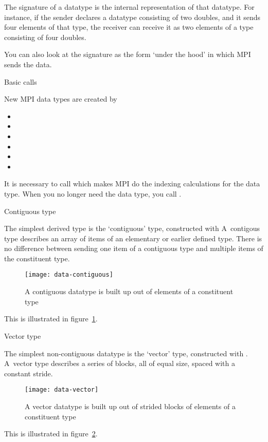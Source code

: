 The signature of a datatype is the internal representation of that
datatype. For instance, if the sender declares a datatype consisting
of two doubles, and it sends four elements of that type, the receiver
can receive it as two elements of a type consisting of four doubles.

You can also look at the signature as the form `under the hood' in which MPI
sends the data.


 {Basic calls}

New MPI data types are created by
\begin{itemize}
\item {}
\item {}
\item {}
\item {}
\item {}
\item {}
\end{itemize}
It is necessary to call  which makes MPI
do the indexing calculations for the data type.  When you no longer
need the data type, you call .

 {Contiguous type}

The simplest derived type is the `contiguous' type,
constructed with 
A~contigous type describes an array of items
of an elementary or earlier defined type. There is no difference between sending
one item of a contiguous type and multiple items of the constituent type.
\begin{figure}[ht]
  \texttt{[image: data-contiguous]}
  \caption{A contiguous datatype is built up out of elements of a constituent type}
  \label{fig:data-contiguous}
\end{figure}
This is illustrated in figure~\ref{fig:data-contiguous}.

 {Vector type}

The simplest non-contiguous datatype is the `vector' type, constructed with
. A~vector type describes a series of blocks, all 
of equal size, spaced with a constant stride.
\begin{figure}[ht]
  \texttt{[image: data-vector]}
  \caption{A vector datatype is built up out of strided blocks of elements of a constituent type}
  \label{fig:data-vector}
\end{figure}
This is illustrated in figure~\ref{fig:data-vector}.

